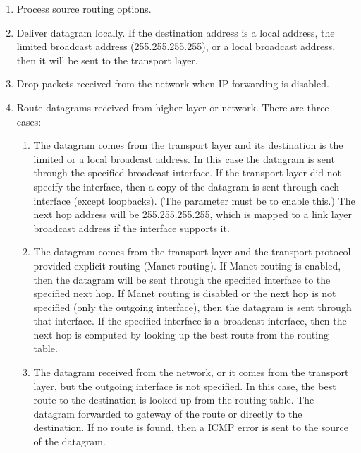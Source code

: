 \begin{enumerate}
  \item Process source routing options.
  \item Deliver datagram locally. If the destination address is a local
  address, the limited broadcast address (255.255.255.255), or a local
  broadcast address, then it will be sent to the transport layer.
  \item Drop packets received from the network when IP forwarding is disabled.
  \item Route datagrams received from higher layer or network. There are
  three cases:
  \begin{enumerate}
    \item The datagram comes from the transport layer and its destination is
    the limited or a local broadcast address.
    In this case the datagram is sent through the specified
    broadcast interface. If the transport layer did not specify
    the interface, then a copy of the datagram is sent through each interface
    (except loopbacks).
    (The  parameter must be  to enable this.) 
    The next hop address will be 255.255.255.255, which is mapped to a link layer
    broadcast address if the interface supports it. 
    \item The datagram comes from the transport layer and the
    transport protocol provided explicit routing (Manet routing).
    If Manet routing is enabled, then the datagram will be sent
    through the specified interface to the specified next hop.
    If Manet routing is disabled or the next hop is not specified
    (only the outgoing interface), then the datagram is sent through
    that interface. If the specified interface is a broadcast interface,
    then the next hop is computed by looking up the best route
    from the routing table.
    \item The datagram received from the network, or it comes from
    the transport layer, but the outgoing interface is not specified.
    In this case, the best route to the destination is looked up from the
    routing table. The datagram forwarded to gateway of the
    route or directly to the destination. If no route is found, then
    a  ICMP error is sent to the source of the
    datagram.
  \end{enumerate}
\end{enumerate}



